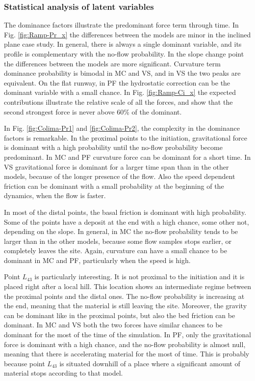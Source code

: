 \documentclass{article}
\begin{document}
\subsubsection{Statistical analysis of latent variables}
The dominance factors illustrate the predominant force term through time. In Fig. \ref{fig:Ramp-Pr_x} the differences between the models are minor in the inclined plane case study. In general, there is always a single dominant variable, and its profile is complementary with the no-flow probability. In the slope change point the differences between the models are more significant. Curvature term dominance probability is bimodal in MC and VS, and in VS the two peaks are equivalent. On the flat runway, in PF the hydrostatic correction can be the dominant variable with a small chance. In Fig. \ref{fig:Ramp-Ci_x} the expected contributions illustrate the relative scale of all the forces, and show that the second strongest force is never above 60\% of the dominant.

In Fig. \ref{fig:Colima-Pr1} and \ref{fig:Colima-Pr2}, the complexity in the dominance factors is remarkable. In the proximal points to the initiation, gravitational force is dominant with a high probability until the no-flow probability become predominant. In MC and PF curvature force can be dominant for a short time. In VS gravitational force is dominant for a larger time span than in the other models, because of the longer presence of the flow. Also the speed dependent friction can be dominant with a small probability at the beginning of the dynamics, when the flow is faster.

In most of the distal points, the basal friction is dominant with high probability. Some of the points have a deposit at the end with a high chance, some other not, depending on the slope. In general, in MC the no-flow probability tends to be larger than in the other models, because some flow samples stops earlier, or completely leaves the site. Again, curvature can have a small chance to be dominant in MC and PF, particularly when the speed is high.

Point $L_{43}$ is particularly interesting. It is not proximal to the initiation and it is placed right after a local hill. This location shows an intermediate regime between the proximal points and the distal ones. The no-flow probability is increasing at the end, meaning that the material is still leaving the site. Moreover, the gravity can be dominant like in the proximal points, but also the bed friction can be dominant. In MC and VS both the two forces have similar chances to be dominant for the most of the time of the simulation. In PF, only the gravitational force is dominant with a high chance, and the no-flow probability is almost null, meaning that there is accelerating material for the most of time. This is probably because point $L_{43}$ is situated downhill of a place where a significant amount of material stops according to that model.
\end{document}
